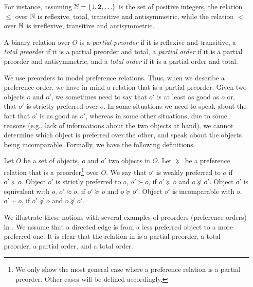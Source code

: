 For instance, assuming $\mathbb{N}=\{1,2,\ldots\}$ is the set of positive integers,
the  relation $\leq$ over $\mathbb{N}$ is reflexive,
total, transitive and antisymmetric, while the  relation
$<$ over $\mathbb{N}$ is irreflexive, transitive and antisymmetric.


\begin{definition}
\label{def:orders}
	A binary relation over $O$ is a \textit{partial preorder} if it is reflexive and transitive,
	a \textit{total preorder} if it is a partial preorder and total,
	a \textit{partial order} if it is a partial preorder and antisymmetric,
	and a \textit{total order} if it is a partial order and total.
\end{definition}

We use preorders to model preference relations.
Thus, when we describe a preference order, we have in mind a relation
that is a partial preorder.
Given two objects $o$ and $o'$,
we sometimes need to say that $o'$ is at least as good as $o$ or,
that $o'$ is strictly preferred over $o$.
In some situations we need to speak about the fact that $o'$ is
as good as $o'$, whereas in some other situations, due to some reasons
(e.g., lack of informations about the two objects at hand), we
cannot determine which object is preferred over the other, and
speak about the objects being incomparable.
Formally, we have the following definitions.
\begin{definition}
	Let $O$ be a set of objects, $o$ and $o'$ two objects in $O$.
	Let $\succeq$ be a preference relation that is a preorder\footnote{
		We only show the most general case where a preference relation is
		a partial preorder.  Other cases will be defined accordingly.
	}
	over $O$.
	We say that $o'$ is weakly preferred to $o$ if $o' \succeq o$.
	Object $o'$ is strictly preferred to $o$, $o' \succ o$, if $o' \succeq o$ and $o \not \succeq o'$.
	Object $o'$ is equivalent with $o$, $o' \approx o$, if $o' \succeq o$ and $o \succeq o'$.
	Object $o'$ is incomparable with $o$, $o' \sim o$, if $o' \not \succeq o$ and $o \not \succeq o'$.
\end{definition}

We illustrate these notions with several examples of preorders (preference orders)
in .
We assume that a directed edge is from a less preferred object to
a more preferred one.
It is clear that the relation in  is a partial 
preorder,  a total preorder,  a partial
order, and  a total order.


